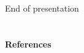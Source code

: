 \documentclass[compress,8pt]{beamer}
\begin{document}
{
\begin{frame}[plain]
 
 \begin{center}
 \Large End of presentation
  \end{center}
  
\end{frame}
}



\section*{}
\begin{frame}


\textbf{References}

\bigskip

\tiny

 
\end{frame}
\end{document}

